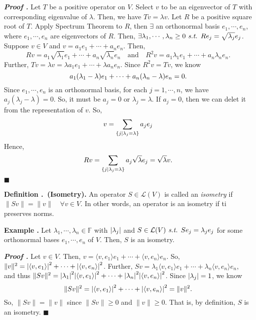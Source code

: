 \documentclass[11pt, letterpaper]{article}
\newcounter{index}[subsection]
\newenvironment*{df}[1]{\par\noindent\textbf{Definition \thesubsection.\stepcounter{index}\theindex\ (#1).}}{\par}
\newenvironment*{eg}{\begin{framed}\par\noindent\textbf{Example \thesubsection.\stepcounter{index}\theindex}}{\par\end{framed}}
\newcounter{nprf}[subsection]
\newenvironment*{prf}{\par\indent\textbf{\textit{Proof \stepcounter{nprf}\thenprf.}}}{\hfill$\blacksquare$\par}
\def\F{\mathbb{F}}
\def\L{\mathcal{L}}
\def\st{\emph{ s.t. }}
\begin{document}
\begin{prf}
	Let $T$ be a positive operator on $V$. Select $v$ to be an eigenvector of $T$ with corresponding eigenvalue of $\lambda$. Then, we have $Tv=\lambda v$. Let $R$ be a positive square root of $T$. Apply Spectrum Theorem to $R$, then $\exists$ an orthonormal basis $e_1,\cdots,e_n$, where $e_1,\cdots,e_n$ are eigenvectors of $R$. Then, $\exists\lambda_1,\cdots,\lambda_n\geq0\st Re_j=\sqrt{\lambda_j}e_j$. Suppose $v\in V$ and $v=a_1e_1+\cdots+a_ne_n$. Then, \[Rv=a_1\sqrt{\lambda_1}e_1+\cdots+a_n\sqrt{\lambda_n}e_n\quad\text{and}\quad R^2v=a_1\lambda_1e_1+\cdots+a_n\lambda_ne_n.\] Further, $Tv=\lambda v=\lambda a_1e_1+\cdots+\lambda a_ne_n$. Since $R^2v=Tv$, we know \[a_1\qty(\lambda_1-\lambda)e_1+\cdots+a_n\qty(\lambda_n-\lambda)e_n=0.\] Since $e_1,\cdots,e_n$ is an orthonormal basis, for each $j=1,\cdots,n$, we have $a_j(\lambda_j-\lambda)=0$. So, it must be $a_j=0$ or $\lambda_j=\lambda$. If $a_j=0$, then we can delet it from the representation of $v$. So, \[v=\sum_{\qty{j\mid\lambda_j=\lambda}}a_je_j\] Hence, \[Rv=\sum_{\qty{j\mid\lambda_j=\lambda}}a_j\sqrt{\lambda}e_j=\sqrt{\lambda}v.\]
\end{prf}
\begin{df}{Isometry}
	An operator $S\in\L(V)$ is called an \textit{isometry} if $\|Sv\|=\|v\|\quad\forall v\in V$. In other words, an operator is an isometry if ti preserves norms. 	
\end{df}
\begin{eg}
	Let $\lambda_1,\cdots,\lambda_n\in\F$ with $\qty|\lambda_j|$ and $S\in\L(V)\st Se_j=\lambda_je_j$ for some orthonormal bases $e_1,\cdots,e_n$ of $V$. Then, $S$ is an isometry. 
	\begin{prf}
		Let $v\in V$. Then, $v=\langle v,e_1\rangle e_1+\cdots+\langle v,e_n\rangle e_n$. So, $\|v\|^2=\qty|\langle v,e_1\rangle|^2+\cdots+\qty|\langle v,e_n\rangle|^2$. Further, $Sv=\lambda_1\langle v,e_1\rangle e_1+\cdots+\lambda_n\langle v,e_n\rangle e_n,$ and thus $\|Sv\|^2=\qty|\lambda_1|^2\qty|\langle v,e_1\rangle|^2+\cdots+\qty|\lambda_n|^2\qty|\langle v,e_n\rangle|^2$. Since $\qty|\lambda_j|=1$, we know \[\|Sv\|^2=\qty|\langle v,e_1\rangle|^2+\cdots+\qty|\langle v,e_n\rangle|^2=\|v\|^2.\] So, $\|Sv\|=\|v\|$ since $\|Sv\|\geq0$ and $\|v\|\geq0$. That is, by definition, $S$ is an isometry. 
	\end{prf}
\end{eg}
\end{document}
